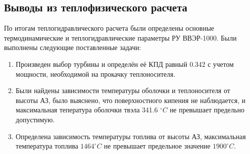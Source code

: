 \subsection{Выводы из теплофизического расчета}
По итогам теплогидравлического расчета были определены основные термодинамические и теплогидравлические параметры РУ ВВЭР-1000. Были выполнены следующие поставленные задачи:
\begin{enumerate}
   \item Произведен выбор турбины и определён её КПД равный 0.342 с учетом мощности, необходимой на прокачку теплоносителя.
   \item Были найдены зависимости температуры оболочки и теплоносителя от высоты АЗ, было выяснено, что поверхностного кипения не наблюдается, и максимальная тепература оболочки твэла 341.6 $^\circ C$ не превышает предельно допустимую.
   \item Определена зависимость температуры топлива от высоты АЗ, максимальная температура топлива $1464 ^\circ C$ не превышает предельное значение $1900 ^\circ C$.
\end{enumerate}

